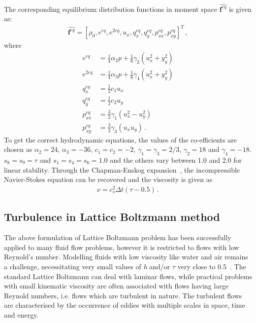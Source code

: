 %
The corresponding equilibrium distribution functions in moment space 
$\widehat{\mathbf{f}^{eq}}$ is given as:
%
\begin{align}
\widehat{\mathbf{f}^{eq}}=\left[\rho_0,e^{eq}, 
e^{2eq},u_x,q_x^{eq},q_y^{eq},p_{xx}^{eq},p_{xy}^{eq}\right]^T\,,
\end{align}
%
\noindent where
%
\begin{align}
e^{eq} & = \frac{1}{4}\alpha_2p+\frac{1}{6}\gamma_2(u_x^2+y_y^2)\\
e^{2eq} & = \frac{1}{4}\alpha_3p+\frac{1}{6}\gamma_4(u_x^2+y_y^2)\\
q_x^{eq} & = \frac{1}{2}c_1u_x\\
q_y^{eq} & = \frac{1}{2}c_2u_y \\
p_{xx}^{eq} & = \frac{3}{2}\gamma_1(u_x^2 - u_y^2)\\
p_{xy}^{eq} & = \frac{3}{2}\gamma_3(u_xu_y) \,.
\end{align}
%
To get the correct hydrodynamic equations, the values of the co-efficients are 
chosen as $\alpha_2=24$,  $\alpha_3=-36$, $c_1=c_2=-2$, 
$\gamma_1=\gamma_3=2/3$, $\gamma_2=18$ and $\gamma_4=-18$. $s_8 = s_9 = \tau$ 
and $s_1=s_4=s_6=1.0$ and the others vary between 1.0 and 2.0 for linear 
stability. Through the Chapman-Enskog expansion~\citep{Du2006}, the 
incompressible Navier-Stokes equation can be recovered and the viscosity is 
given as
%
\begin{align}
\nu=c_s^2\Delta t(\tau-0.5)\,.
\end{align}


\subsection{Turbulence in Lattice Boltzmann method}

The above formulation of Lattice Boltzmann problem has been successfully 
applied to many fluid flow problems, however it is restricted to flows with low 
Reynold's number. Modelling fluids with low viscosity like water and air 
remains a challenge, necessitating very small values of \textit{h} and/or 
$\tau$ very close to 0.5~\citep{He1997}. The standard Lattice Boltzmann can 
deal with laminar flows, while practical problems with small kinematic 
viscosity are often associated with flows having large Reynold numbers, i.e. 
flows which are turbulent in nature. The turbulent flows are characterised by 
the occurrence of eddies with multiple scales in space, time and energy.

